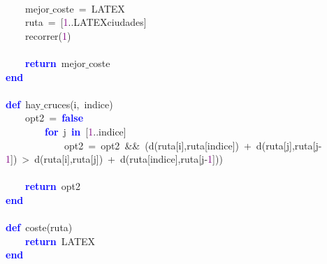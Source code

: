 \mbox{} \\
\mbox{}\ \ \ \ mejor$\_$coste\ \textcolor{BrickRed}{=}\ LATEX \\
\mbox{}\ \ \ \ ruta\ \textcolor{BrickRed}{=}\ \textcolor{BrickRed}{[}\textcolor{Purple}{1}\textcolor{BrickRed}{..}LATEXciudades\textcolor{BrickRed}{]} \\
\mbox{}\ \ \ \ recorrer\textcolor{BrickRed}{(}\textcolor{Purple}{1}\textcolor{BrickRed}{)} \\
\mbox{} \\
\mbox{}\ \ \ \ \textbf{\textcolor{Blue}{return}}\ mejor$\_$coste \\
\mbox{}\textbf{\textcolor{Blue}{end}} \\
\mbox{} \\
\mbox{}\textbf{\textcolor{Blue}{def}}\ hay$\_$cruces\textcolor{BrickRed}{(}i\textcolor{BrickRed}{,}\ indice\textcolor{BrickRed}{)} \\
\mbox{}\ \ \ \ opt2\ \textcolor{BrickRed}{=}\ \textbf{\textcolor{Blue}{false}} \\
\mbox{}\ \ \ \ \ \ \ \ \textbf{\textcolor{Blue}{for}}\ j\ \textbf{\textcolor{Blue}{in}}\ \textcolor{BrickRed}{[}\textcolor{Purple}{1}\textcolor{BrickRed}{..}indice\textcolor{BrickRed}{]} \\
\mbox{}\ \ \ \ \ \ \ \ \ \ \ \ opt2\ \textcolor{BrickRed}{=}\ opt2\ \textcolor{BrickRed}{\&\&}\ \textcolor{BrickRed}{(}d\textcolor{BrickRed}{(}ruta\textcolor{BrickRed}{[}i\textcolor{BrickRed}{],}ruta\textcolor{BrickRed}{[}indice\textcolor{BrickRed}{])}\ \textcolor{BrickRed}{+}\ d\textcolor{BrickRed}{(}ruta\textcolor{BrickRed}{[}j\textcolor{BrickRed}{],}ruta\textcolor{BrickRed}{[}j\textcolor{BrickRed}{-}\textcolor{Purple}{1}\textcolor{BrickRed}{])}\ \textcolor{BrickRed}{\textgreater{}}\ d\textcolor{BrickRed}{(}ruta\textcolor{BrickRed}{[}i\textcolor{BrickRed}{],}ruta\textcolor{BrickRed}{[}j\textcolor{BrickRed}{])}\ \textcolor{BrickRed}{+}\ d\textcolor{BrickRed}{(}ruta\textcolor{BrickRed}{[}indice\textcolor{BrickRed}{],}ruta\textcolor{BrickRed}{[}j\textcolor{BrickRed}{-}\textcolor{Purple}{1}\textcolor{BrickRed}{]))} \\
\mbox{} \\
\mbox{}\ \ \ \ \textbf{\textcolor{Blue}{return}}\ opt2 \\
\mbox{}\textbf{\textcolor{Blue}{end}} \\
\mbox{} \\
\mbox{}\textbf{\textcolor{Blue}{def}}\ coste\textcolor{BrickRed}{(}ruta\textcolor{BrickRed}{)} \\
\mbox{}\ \ \ \ \textbf{\textcolor{Blue}{return}}\ LATEX \\
\mbox{}\textbf{\textcolor{Blue}{end}} \\
\mbox{}
